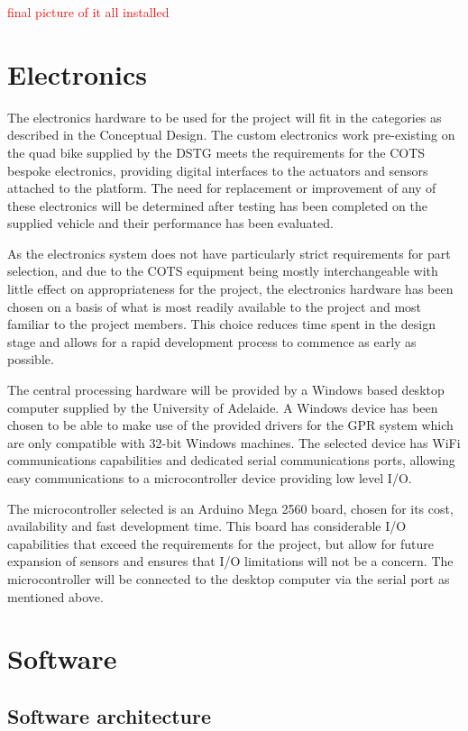 \documentclass[main.tex]{subfiles}
\begin{document}
\textcolor{red}{final picture of it all installed }  

\section{Electronics}
The electronics hardware to be used for the project will fit in the categories as described in the Conceptual Design. The custom electronics work pre-existing on the quad bike supplied by the DSTG meets the requirements for the COTS bespoke electronics, providing digital interfaces to the actuators and sensors attached to the platform. The need for replacement or improvement of any of these electronics will be determined after testing has been completed on the supplied vehicle and their performance has been evaluated.

As the electronics system does not have particularly strict requirements for part selection, and due to the COTS equipment being mostly interchangeable with little effect on appropriateness for the project, the electronics hardware has been chosen on a basis of what is most readily available to the project and most familiar to the project members. This choice reduces time spent in the design stage and allows for a rapid development process to commence as early as possible.

The central processing hardware will be provided by a Windows based desktop computer supplied by the University of Adelaide. A Windows device has been chosen to be able to make use of the provided drivers for the GPR system which are only compatible with 32-bit Windows machines. The selected device has WiFi communications capabilities and dedicated serial communications ports, allowing easy communications to a microcontroller device providing low level I/O.

The microcontroller selected is an Arduino Mega 2560 board, chosen for its cost, availability and fast development time. This board has considerable I/O capabilities that exceed the requirements for the project, but allow for future expansion of sensors and ensures that I/O limitations will not be a concern. The microcontroller will be connected to the desktop computer via the serial port as mentioned above.

\section{Software}

\subsection{Software architecture}
\end{document}
